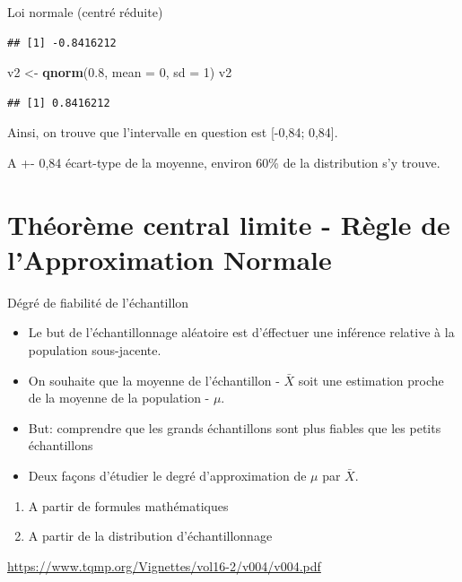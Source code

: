\documentclass[ignorenonframetext,]{beamer}
\newenvironment{Shaded}{\begin{snugshade}}{\end{snugshade}}
\newcommand{\KeywordTok}[1]{\textcolor[rgb]{0.13,0.29,0.53}{\textbf{#1}}}
\newcommand{\DataTypeTok}[1]{\textcolor[rgb]{0.13,0.29,0.53}{#1}}
\newcommand{\DecValTok}[1]{\textcolor[rgb]{0.00,0.00,0.81}{#1}}
\newcommand{\FloatTok}[1]{\textcolor[rgb]{0.00,0.00,0.81}{#1}}
\newcommand{\StringTok}[1]{\textcolor[rgb]{0.31,0.60,0.02}{#1}}
\newcommand{\NormalTok}[1]{#1}
\providecommand{\tightlist}{%
  \setlength{\itemsep}{0pt}\setlength{\parskip}{0pt}}
\begin{document}
\begin{frame}[fragile]{Loi normale (centré réduite)}
\begin{verbatim}
## [1] -0.8416212
\end{verbatim}

\begin{Shaded}
\begin{Highlighting}[]
\NormalTok{v2 <-}\StringTok{ }\KeywordTok{qnorm}\NormalTok{(}\FloatTok{0.8}\NormalTok{, }\DataTypeTok{mean =} \DecValTok{0}\NormalTok{, }\DataTypeTok{sd =} \DecValTok{1}\NormalTok{)}
\NormalTok{v2}
\end{Highlighting}
\end{Shaded}

\begin{verbatim}
## [1] 0.8416212
\end{verbatim}

Ainsi, on trouve que l'intervalle en question est {[}-0,84; 0,84{]}.

A +- 0,84 écart-type de la moyenne, environ 60\% de la distribution s'y
trouve.

\end{frame}

\section{Théorème central limite - Règle de l'Approximation
Normale}\label{thuxe9oruxe8me-central-limite---ruxe8gle-de-lapproximation-normale}

\begin{frame}{Dégré de fiabilité de l'échantillon}

\begin{itemize}
\tightlist
\item
  Le but de l'échantillonnage aléatoire est d'éffectuer une inférence
  relative à la population sous-jacente.
\item
  On souhaite que la moyenne de l'échantillon - \(\bar{X}\) soit une
  estimation proche de la moyenne de la population - \(\mu\).
\item
  But: comprendre que les grands échantillons sont plus fiables que les
  petits échantillons
\item
  Deux façons d'étudier le degré d'approximation de \(\mu\) par
  \(\bar{X}\).
\end{itemize}

\begin{enumerate}
\def\labelenumi{\arabic{enumi}.}
\tightlist
\item
  A partir de formules mathématiques
\item
  A partir de la distribution d'échantillonnage
\end{enumerate}

\url{https://www.tqmp.org/Vignettes/vol16-2/v004/v004.pdf}

\end{frame}
\end{document}
